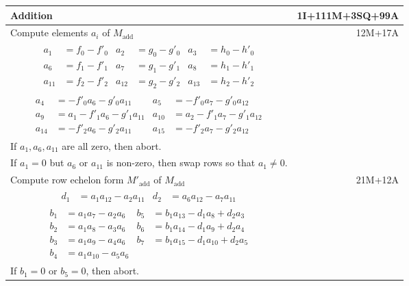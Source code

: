 \setlength{\tempabovedisplayskip}{\abovedisplayskip}
\setlength{\tempbelowdisplayskip}{\belowdisplayskip}
\setlength{\abovedisplayskip}{-10pt}
\setlength{\belowdisplayskip}{-10pt}
\begin{tabularx}{\linewidth}{|Xr|}
  \hline
  Addition & 1I+111M+3SQ+99A \\
  \hline
  Compute elements $a_i$ of $M_{\text{add}}$ & 12M+17A \\
  \hline
  {\begin{align*}
    a_1    &= f_0 - f'_0 & a_2    &= g_0 - g'_0 & a_3    &= h_0 - h'_0 \\
    a_6    &= f_1 - f'_1 & a_7    &= g_1 - g'_1 & a_8    &= h_1 - h'_1 \\
    a_{11} &= f_2 - f'_2 & a_{12} &= g_2 - g'_2 & a_{13} &= h_2 - h'_2
  \end{align*}} & \\
  {\begin{align*}
    a_4    &=     - f'_0a_6 - g'_0a_{11} & a_5    &=     - f'_0a_7 - g'_0a_{12} \\
    a_9    &= a_1 - f'_1a_6 - g'_1a_{11} & a_{10} &= a_2 - f'_1a_7 - g'_1a_{12} \\
    a_{14} &=     - f'_2a_6 - g'_2a_{11} & a_{15} &=     - f'_2a_7 - g'_2a_{12}
  \end{align*}} & \\
  If $a_1, a_6, a_{11}$ are all zero, then abort. & \\
  If $a_1 = 0$ but $a_6$ or $a_{11}$ is non-zero, then swap rows so that $a_1 \neq 0$. & \\
  \hline
  Compute row echelon form $M'_{\text{add}}$ of $M_{\text{add}}$ & 21M+12A \\
  \hline
  {\begin{align*}
    d_1 &= a_1a_{12} - a_2a_{11} & d_2 &= a_6a_{12} - a_7a_{11} 
  \end{align*}} & \\
  {\begin{align*}
    b_1 &= a_1a_7    - a_2a_6 & b_5 &= b_1a_{13} - d_1a_8    + d_2a_3 \\
    b_2 &= a_1a_8    - a_3a_6 & b_6 &= b_1a_{14} - d_1a_9    + d_2a_4 \\
    b_3 &= a_1a_9    - a_4a_6 & b_7 &= b_1a_{15} - d_1a_{10} + d_2a_5 \\
    b_4 &= a_1a_{10} - a_5a_6
  \end{align*}} & \\
  If $b_1 =0$ or $b_5 = 0$, then abort. & \\

\end{tabularx}
